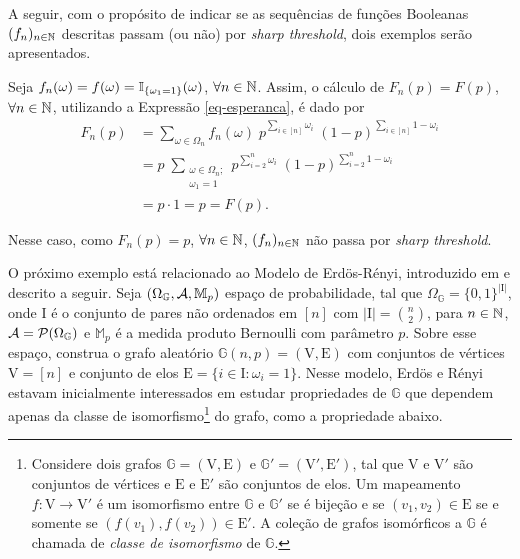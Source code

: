 \par A seguir, com o propósito de indicar se as sequências de funções Booleanas $(f_n)_{n \in \operatorname{\mathbb{N}}}$ descritas passam (ou não) por \textit{sharp threshold}, dois exemplos serão apresentados.

\begin{myexp}\label{exemplo-1}
	Seja $f_n(\omega) = f(\omega) = \operatorname{\mathbb{I}}_{\{\omega_1 = 1\}}(\omega)$, $\forall n \in \operatorname{\mathbb{N}}$. Assim, o cálculo de $F_n(p) = F(p)$, $\forall n \in \operatorname{\mathbb{N}}$, utilizando a Expressão \eqref{eq-esperanca}, é dado por
	\begin{align*}
	F_n(p) & = \sum_{\omega \in \Omega_n} f_n(\omega) \; p^{\sum_{i \in [n]}\omega_i} \; (1 - p)^{\sum_{i \in [n]}1 - \omega_i} \\
		   & = p \;\sum_{\substack{\omega \in \Omega_n; \\ \omega_1 = 1}} p^{\sum_{i = 2}^{n}\omega_i} \; (1 - p)^{\sum_{i = 2}^{n} 1 - \omega_i} \\
		   & = p \cdot 1 = p = F(p).
	\end{align*}
\end{myexp}

\par Nesse caso, como $F_n(p) = p$, $\forall n \in \operatorname{\mathbb{N}}$, $(f_n)_{n \in \operatorname{\mathbb{N}}}$ não passa por \textit{sharp threshold}.

\par O próximo exemplo está relacionado ao Modelo de Erd\"os-Rényi, introduzido em \cite{erdos1959random} e descrito a seguir. Seja $(\Omega_{\mathbb{G}}, \operatorname{\mathcal{A}}, \mathbb{M}_p)$ espaço de probabilidade, tal que $\Omega_{\mathbb{G}} = \{0, 1\}^{|\text{I}|}$, onde $\text{I}$ é o conjunto de pares não ordenados em $[n]$ com $|\text{I}| = {n \choose 2}$, para $n \in \operatorname{\mathbb{N}}$, $\operatorname{\mathcal{A}} = \mathcal{P}(\Omega_{\mathbb{G}})$ e $\mathbb{M}_p$ é a medida produto Bernoulli com parâmetro $p$. Sobre esse espaço, construa o grafo aleatório $\mathbb{G}(n, p) = (\text{V}, \text{E})$ com conjuntos de vértices $\text{V} = [n]$ e conjunto de elos $\text{E} = \{i \in \text{I} : \omega_i = 1\}$. Nesse modelo, Erd\"os e Rényi estavam inicialmente interessados em estudar propriedades de $\mathbb{G}$ que dependem apenas da classe de isomorfismo\footnote{Considere dois grafos $\mathbb{G} = (\text{V}, \text{E})$ e $\mathbb{G}' = (\text{V}', \text{E}')$, tal que $\text{V}$ e $\text{V}'$ são conjuntos de vértices e $\text{E}$ e $\text{E}'$ são conjuntos de elos. Um mapeamento $f: \text{V} \longrightarrow \text{V}'$ é um isomorfismo entre $\mathbb{G}$ e $\mathbb{G}'$ se é bijeção e se $(v_1, v_2) \in \text{E}$ se e somente se $(f(v_1), f(v_2)) \in \text{E}'$. A coleção de grafos isomórficos a $\mathbb{G}$ é chamada de \textit{classe de isomorfismo} de $\mathbb{G}$.} do grafo, como a propriedade abaixo.

